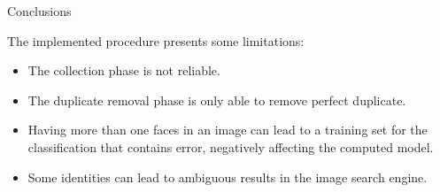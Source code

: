 \begin{tframe}{Conclusions}

The implemented procedure presents some limitations:

\begin{itemize}
\item The collection phase is not reliable.
\item The duplicate removal phase is only able to remove perfect duplicate.
\item Having more than one faces in an image can lead to a training set for the classification that contains error, negatively affecting the computed model.
\item Some identities can lead to ambiguous results in the image search engine.
\end{itemize}

\end{tframe}